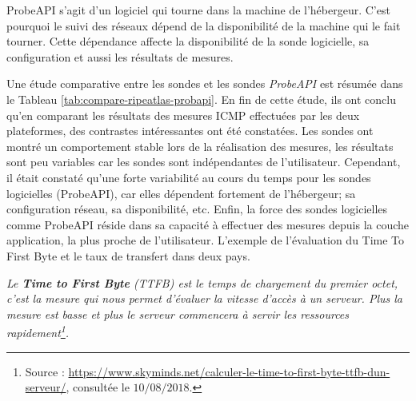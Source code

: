 ProbeAPI s'agit d'un logiciel qui tourne dans la machine de l'hébergeur. C'est pourquoi le suivi des réseaux dépend de la disponibilité de la machine qui le fait  tourner. Cette dépendance  affecte la disponibilité de la sonde logicielle, sa configuration et aussi les résultats de mesures.

Une étude comparative \cite{COMPARE-ATLAS-PROBEAPI}  entre les sondes   et les sondes \textit{ProbeAPI} est résumée dans le Tableau \ref{tab:compare-ripeatlas-probapi}. 
En fin de cette étude, ils ont conclu qu'en comparant les résultats des mesures ICMP effectuées par les deux plateformes, des contrastes intéressantes ont été constatées.  Les sondes  ont montré un comportement stable lors de la réalisation  des mesures, les résultats sont peu variables car les sondes sont indépendantes de l'utilisateur. Cependant, il était constaté qu'une forte variabilité au cours du temps pour les sondes logicielles (ProbeAPI), car elles dépendent fortement de l'hébergeur; sa configuration réseau, sa disponibilité, etc.
Enfin, la force des sondes logicielles comme  ProbeAPI réside dans sa capacité  à effectuer des mesures depuis la couche application, la plus proche de l'utilisateur. L'exemple de l'évaluation du Time To First Byte et le taux de transfert dans deux pays.
\begin{tcolorbox}
	\og \textit{	Le \textbf{Time to First Byte} (TTFB) est le temps de chargement du premier octet, c'est la mesure qui nous permet d'évaluer la vitesse d'accès à un serveur. Plus la mesure est basse et plus le serveur commencera à servir les ressources rapidement\footnote{Source : \url{https://www.skyminds.net/calculer-le-time-to-first-byte-ttfb-dun-serveur/}, consultée le $10/08/2018$.}.} \fg{} 
\end{tcolorbox}


